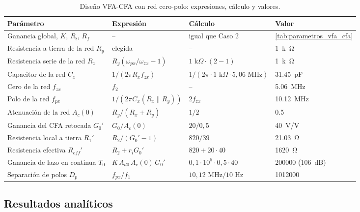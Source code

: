 \begin{table}[H]
\centering
\caption{Diseño VFA-CFA con red cero-polo: expresiones, cálculo y valores.}
\label{tab:parametros_vfa_cfa_red}
\footnotesize
\setlength{\tabcolsep}{4pt}
\begin{tabular}{>{\raggedright\arraybackslash}p{} >{\centering\arraybackslash}p{} >{\centering\arraybackslash}p{} >{\centering\arraybackslash}p{}}
\toprule
\textbf{Parámetro} & \textbf{Expresión} & \textbf{Cálculo} & \textbf{Valor} \\
\midrule
Ganancia global, $K$, $R_i$, $R_f$ & -- & igual que Caso 2 & \autoref{tab:parametros_vfa_cfa} \\
Resistencia a tierra de la red $R_y$ & elegida & -- & \SI{1}{k\ohm} \\
Resistencia serie de la red $R_x$ & $R_y(\omega_{px}/\omega_{zx}-1)$ & $1\text{ k}\Omega\cdot(2-1)$ & \SI{1}{k\ohm} \\
Capacitor de la red $C_x$ & $1/(2\pi R_xf_{zx})$ & $1/(2\pi\cdot 1\text{ k}\Omega\cdot 5{,}06\text{ MHz})$ & \SI{31,45}{pF} \\
Cero de la red $f_{zx}$ & $f_2$ & -- & \SI{5,06}{MHz} \\
Polo de la red $f_{px}$ & $1/(2\pi C_x(R_x\parallel R_y))$ & $2f_{zx}$ & \SI{10,12}{MHz} \\
Atenuación de la red $A_c(0)$ & $R_y/(R_x+R_y)$ & $1/2$ & \num{0,5} \\
Ganancia del CFA retocada $G_0'$ & $G_0/A_c(0)$ & $20/0{,}5$ & \SI{40}{V/V} \\
Resistencia local a tierra $R_1'$ & $R_2/(G_0'-1)$ & $820/39$ & \SI{21,03}{\ohm} \\
Resistencia efectiva $R_{eff}'$ & $R_2+r_iG_0'$ & $820+20\cdot 40$ & \SI{1620}{\ohm} \\
Ganancia de lazo en continua $T_0$ & $K\,A_{d0}\,A_c(0)\,G_0'$ & $0{,}1\cdot10^5\cdot0{,}5\cdot40$ & \num{200000} (\SI{106}{dB}) \\
Separación de polos $D_p$ & $f_{px}/f_1$ & $10{,}12\text{ MHz}/10\text{ Hz}$ & \num{1012000} \\
\bottomrule
\end{tabular}
\end{table}

\subsection{Resultados analíticos}
\label{sec:analitico_c3}

